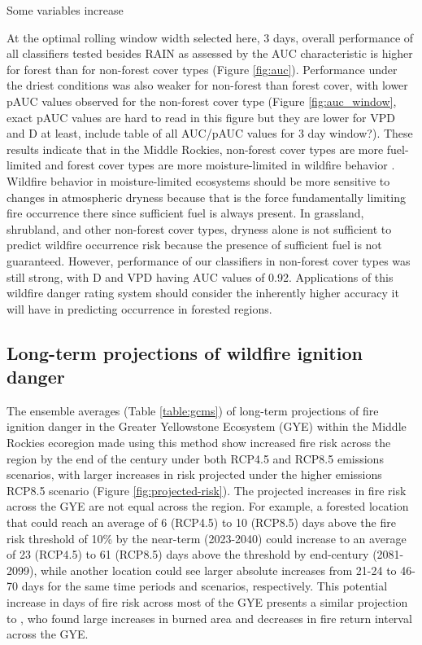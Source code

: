 \documentclass[11pt]{article}
\begin{document}
Some variables increase


At the optimal rolling window width selected here, 3 days, overall performance of all classifiers tested besides RAIN as assessed by the AUC characteristic is higher for forest than for non-forest cover types (Figure \ref{fig:auc}). Performance under the driest conditions was also weaker for non-forest than forest cover, with lower pAUC values observed for the non-forest cover type (Figure \ref{fig:auc_window}, exact pAUC values are hard to read in this figure but they are lower for VPD and D at least, include table of all AUC/pAUC values for 3 day window?).  These results indicate that in the Middle Rockies, non-forest cover types are more fuel-limited and forest cover types are more moisture-limited in wildfire behavior \citep{meynEnvironmentalDriversLarge2007}. Wildfire behavior in moisture-limited ecosystems should be more sensitive to changes in atmospheric dryness because that is the force fundamentally limiting fire occurrence there since sufficient fuel is always present.  In grassland, shrubland, and other non-forest cover types, dryness alone is not sufficient to predict wildfire occurrence risk because the presence of sufficient fuel is not guaranteed.  However, performance of our classifiers in non-forest cover types was still strong, with D and VPD having AUC values of 0.92. Applications of this wildfire danger rating system should consider the inherently higher accuracy it will have in predicting occurrence in forested regions.  

\subsection{Long-term projections of wildfire ignition danger}

The ensemble averages (Table \ref{table:gcms}) of long-term projections of fire ignition danger in the Greater Yellowstone Ecosystem (GYE) within the Middle Rockies ecoregion made using this method show increased fire risk across the region by the end of the century under both RCP4.5 and RCP8.5 emissions scenarios, with larger increases in risk projected under the higher emissions RCP8.5 scenario (Figure \ref{fig:projected-risk}). The projected increases in fire risk across the GYE are not equal across the region.  For example, a forested location that could reach an average of 6 (RCP4.5) to 10 (RCP8.5) days above the fire risk threshold of 10\% by the near-term (2023-2040) could increase to an average of 23 (RCP4.5) to 61 (RCP8.5) days above the threshold by end-century (2081-2099), while another location could see larger absolute increases from 21-24 to 46-70 days for the same time periods and scenarios, respectively.  This potential increase in days of fire risk across most of the GYE presents a similar projection to \citet{westerlingContinuedWarmingCould2011}, who found large increases in burned area and decreases in fire return interval across the GYE.  
\end{document}
